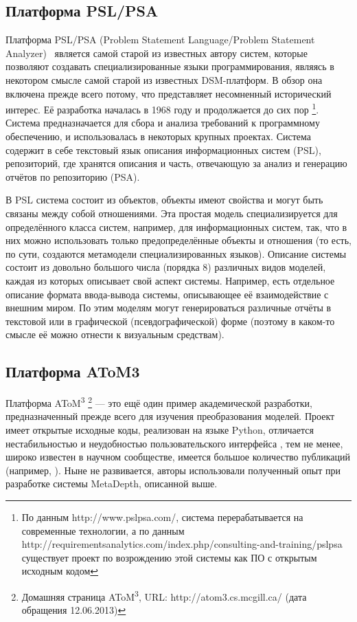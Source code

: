 \subsection{Платформа PSL/PSA}
Платформа PSL/PSA (Problem Statement Language/Problem Statement Analyzer)~\cite{teichroew1977psl} 
является самой старой из известных автору систем, которые позволяют создавать специализированные языки программирования, являясь в некотором
смысле самой старой из известных \ac{DSM}-платформ. В обзор она включена прежде всего потому, 
что представляет несомненный исторический интерес. Её разработка началась в 1968 году и продолжается до сих пор%
\footnote{По данным http://www.pslpsa.com/, система перерабатывается на современные технологии,
а по данным http://requirementsanalytics.com/index.php/consulting-and-training/pslpsa 
существует проект по возрождению этой системы как ПО с открытым исходным кодом}. Система 
предназначается для сбора и анализа требований к программному обеспечению, и использовалась в некоторых крупных
проектах. Система содержит в себе текстовый язык описания информационных систем (PSL), репозиторий, 
где хранятся описания и часть, отвечающую за анализ и генерацию отчётов по репозиторию (PSA).

В PSL система состоит из объектов, объекты имеют свойства и могут быть связаны между 
собой отношениями. Эта простая модель специализируется для определённого класса систем, 
например, для информационных систем, так, что в них можно использовать только предопределённые 
объекты и отношения (то есть, по сути, создаются метамодели специализированных языков). 
Описание системы состоит из довольно большого числа (порядка 8) различных видов моделей, 
каждая из которых описывает свой аспект системы. Например, есть отдельное описание формата ввода-вывода 
системы, описывающее её взаимодействие с внешним миром. По этим моделям могут генерироваться 
различные отчёты в текстовой или в графической (псевдографической) форме (поэтому в каком-то смысле
её можно отнести к визуальным средствам).

\subsection{Платформа AToM3}
Платформа AToM\textsuperscript{3}%
\footnote{Домашняя страница AToM\textsuperscript{3}, URL: http://atom3.cs.mcgill.ca/ (дата обращения 12.06.2013)}
--- это ещё один пример академической разработки, предназначенный прежде всего для изучения преобразования моделей. Проект имеет открытые 
исходные коды, реализован на языке Python, отличается нестабильностью и неудобностью пользовательского интерфейса%
, тем не менее, широко известен в научном сообществе, имеется большое количество публикаций (например, \cite{vangheluwe2004domain}).
Ныне не развивается, авторы использовали полученный опыт при разработке системы MetaDepth, описанной выше.

